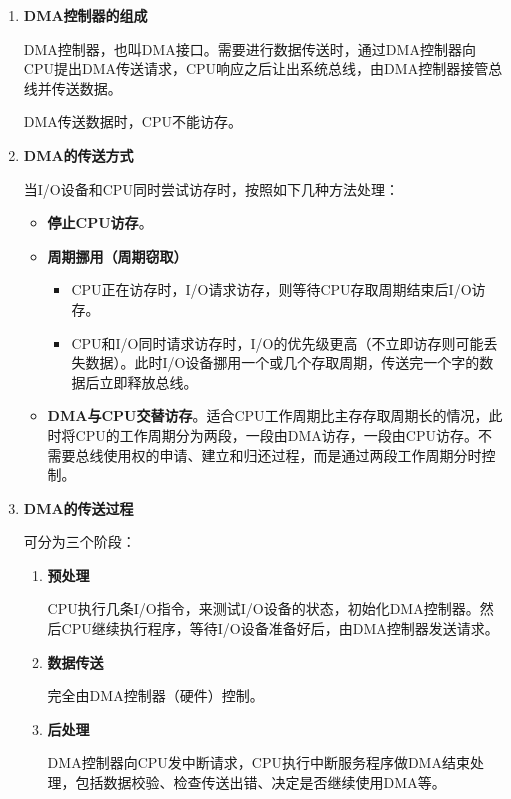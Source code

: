 \documentclass[12pt, a4paper, oneside]{ctexart}
\begin{document}
\begin{enumerate}
  \item {\bf DMA控制器的组成}
  
  DMA控制器，也叫DMA接口。需要进行数据传送时，通过DMA控制器向CPU提出DMA传送请求，CPU响应之后让出系统总线，由DMA控制器接管总线并传送数据。

  DMA传送数据时，CPU不能访存。

  \item {\bf DMA的传送方式}
  
  当I/O设备和CPU同时尝试访存时，按照如下几种方法处理：
  \begin{itemize}
    \item {\bf 停止CPU访存}。
    \item {\bf 周期挪用（周期窃取）}
    \begin{itemize}
      \item CPU正在访存时，I/O请求访存，则等待CPU存取周期结束后I/O访存。
      \item CPU和I/O同时请求访存时，I/O的优先级更高（不立即访存则可能丢失数据）。此时I/O设备挪用一个或几个存取周期，传送完一个字的数据后立即释放总线。
    \end{itemize}
    \item {\bf DMA与CPU交替访存}。适合CPU工作周期比主存存取周期长的情况，此时将CPU的工作周期分为两段，一段由DMA访存，一段由CPU访存。不需要总线使用权的申请、建立和归还过程，而是通过两段工作周期分时控制。
  \end{itemize}
  \item {\bf DMA的传送过程}
  
  可分为三个阶段：
  \begin{enumerate}
    \item {\bf 预处理}
    
    CPU执行几条I/O指令，来测试I/O设备的状态，初始化DMA控制器。然后CPU继续执行程序，等待I/O设备准备好后，由DMA控制器发送请求。

    \item {\bf 数据传送}
    
    完全由DMA控制器（硬件）控制。

    \item {\bf 后处理}
    
    DMA控制器向CPU发中断请求，CPU执行中断服务程序做DMA结束处理，包括数据校验、检查传送出错、决定是否继续使用DMA等。

  \end{enumerate}


\end{enumerate}
\end{document}
